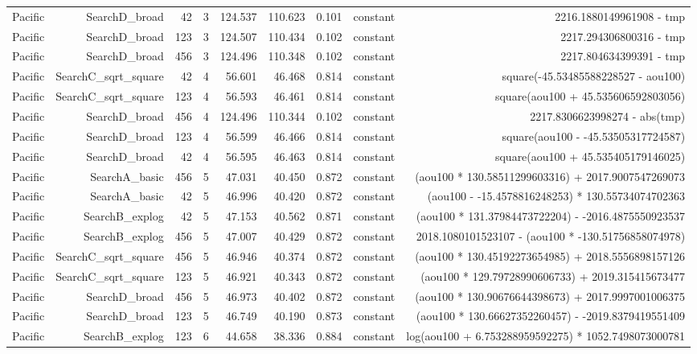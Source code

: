 \begin{table}
{\begin{tabular}{lrrrrrrrr}
Pacific & SearchD\_broad & 42 & 3 & 124.537 & 110.623 & 0.101 & constant & 2216.1880149961908 - tmp \\
Pacific & SearchD\_broad & 123 & 3 & 124.507 & 110.434 & 0.102 & constant & 2217.294306800316 - tmp \\
Pacific & SearchD\_broad & 456 & 3 & 124.496 & 110.348 & 0.102 & constant & 2217.804634399391 - tmp \\
Pacific & SearchC\_sqrt\_square & 42 & 4 & 56.601 & 46.468 & 0.814 & constant & square(-45.53485588228527 - aou100) \\
Pacific & SearchC\_sqrt\_square & 123 & 4 & 56.593 & 46.461 & 0.814 & constant & square(aou100 + 45.535606592803056) \\
Pacific & SearchD\_broad & 456 & 4 & 124.496 & 110.344 & 0.102 & constant & 2217.8306623998274 - abs(tmp) \\
Pacific & SearchD\_broad & 123 & 4 & 56.599 & 46.466 & 0.814 & constant & square(aou100 - -45.53505317724587) \\
Pacific & SearchD\_broad & 42 & 4 & 56.595 & 46.463 & 0.814 & constant & square(aou100 + 45.535405179146025) \\
Pacific & SearchA\_basic & 456 & 5 & 47.031 & 40.450 & 0.872 & constant & (aou100 * 130.58511299603316) + 2017.9007547269073 \\
Pacific & SearchA\_basic & 42 & 5 & 46.996 & 40.420 & 0.872 & constant & (aou100 - -15.4578816248253) * 130.55734074702363 \\
Pacific & SearchB\_explog & 42 & 5 & 47.153 & 40.562 & 0.871 & constant & (aou100 * 131.37984473722204) - -2016.4875550923537 \\
Pacific & SearchB\_explog & 456 & 5 & 47.007 & 40.429 & 0.872 & constant & 2018.1080101523107 - (aou100 * -130.51756858074978) \\
Pacific & SearchC\_sqrt\_square & 456 & 5 & 46.946 & 40.374 & 0.872 & constant & (aou100 * 130.45192273654985) + 2018.5556898157126 \\
Pacific & SearchC\_sqrt\_square & 123 & 5 & 46.921 & 40.343 & 0.872 & constant & (aou100 * 129.79728990606733) + 2019.315415673477 \\
Pacific & SearchD\_broad & 456 & 5 & 46.973 & 40.402 & 0.872 & constant & (aou100 * 130.90676644398673) + 2017.9997001006375 \\
Pacific & SearchD\_broad & 123 & 5 & 46.749 & 40.190 & 0.873 & constant & (aou100 * 130.66627352260457) - -2019.8379419551409 \\
Pacific & SearchB\_explog & 123 & 6 & 44.658 & 38.336 & 0.884 & constant & log(aou100 + 6.753288959592275) * 1052.7498073000781 \\

\end{tabular}}
\end{table}
